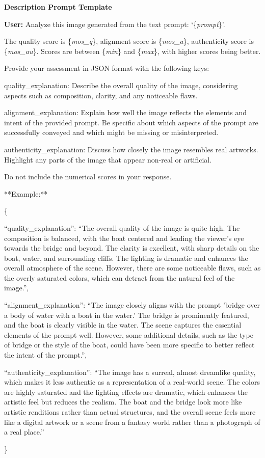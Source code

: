 \begin{mdframed}[linecolor=black,linewidth=0.5pt,roundcorner=10pt]
\textbf{Description Prompt Template}

\textbf{User:} Analyze this image generated from the text prompt: `\{\textit{prompt}\}'.

The quality score is \{\textit{mos\_q}\}, alignment score is \{\textit{mos\_a}\}, authenticity score is \{\textit{mos\_au}\}. Scores are between \{\textit{min}\} and \{\textit{max}\}, with higher scores being better.

Provide your assessment in JSON format with the following keys:

quality\_explanation: Describe the overall quality of the image, considering aspects such as composition, clarity, and any noticeable flaws.

alignment\_explanation: Explain how well the image reflects the elements and intent of the provided prompt. Be specific about which aspects of the prompt are successfully conveyed and which might be missing or misinterpreted.

authenticity\_explanation: Discuss how closely the image resembles real artworks. Highlight any parts of the image that appear non-real or artificial.

Do not include the numerical scores in your response.

**Example:**

\{

  ``quality\_explanation'': ``The overall quality of the image is quite high. The composition is balanced, with the boat centered and leading the viewer's eye towards the bridge and beyond. The clarity is excellent, with sharp details on the boat, water, and surrounding cliffs. The lighting is dramatic and enhances the overall atmosphere of the scene. However, there are some noticeable flaws, such as the overly saturated colors, which can detract from the natural feel of the image.'',
  
  ``alignment\_explanation'': ``The image closely aligns with the prompt 'bridge over a body of water with a boat in the water.' The bridge is prominently featured, and the boat is clearly visible in the water. The scene captures the essential elements of the prompt well. However, some additional details, such as the type of bridge or the style of the boat, could have been more specific to better reflect the intent of the prompt.'',
  
  ``authenticity\_explanation'': ``The image has a surreal, almost dreamlike quality, which makes it less authentic as a representation of a real-world scene. The colors are highly saturated and the lighting effects are dramatic, which enhances the artistic feel but reduces the realism. The boat and the bridge look more like artistic renditions rather than actual structures, and the overall scene feels more like a digital artwork or a scene from a fantasy world rather than a photograph of a real place.''
  
\}
\end{mdframed}

